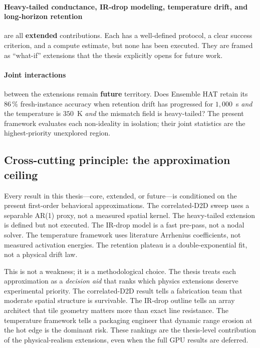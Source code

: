 \paragraph{Heavy-tailed conductance, IR-drop modeling, temperature drift, and long-horizon retention} are all \textbf{extended} contributions.  Each has a well-defined protocol, a clear success criterion, and a compute estimate, but none has been executed.  They are framed as ``what-if'' extensions that the thesis explicitly opens for future work.

\paragraph{Joint interactions} between the extensions remain \textbf{future} territory.  Does Ensemble HAT retain its $86\,\%$ fresh-instance accuracy when retention drift has progressed for $1{,}000$~s \emph{and} the temperature is $350$~K \emph{and} the mismatch field is heavy-tailed?  The present framework evaluates each non-ideality in isolation; their joint statistics are the highest-priority unexplored region.

\subsection{Cross-cutting principle: the approximation ceiling}

Every result in this thesis---core, extended, or future---is conditioned on the present first-order behavioral approximations.  The correlated-D2D sweep uses a separable AR(1) proxy, not a measured spatial kernel.  The heavy-tailed extension is defined but not executed.  The IR-drop model is a fast pre-pass, not a nodal solver.  The temperature framework uses literature Arrhenius coefficients, not measured activation energies.  The retention plateau is a double-exponential fit, not a physical drift law.

This is not a weakness; it is a methodological choice.  The thesis treats each approximation as a \emph{decision aid} that ranks which physics extensions deserve experimental priority.  The correlated-D2D result tells a fabrication team that moderate spatial structure is survivable.  The IR-drop outline tells an array architect that tile geometry matters more than exact line resistance.  The temperature framework tells a packaging engineer that dynamic range erosion at the hot edge is the dominant risk.  These rankings are the thesis-level contribution of the physical-realism extensions, even when the full GPU results are deferred.

